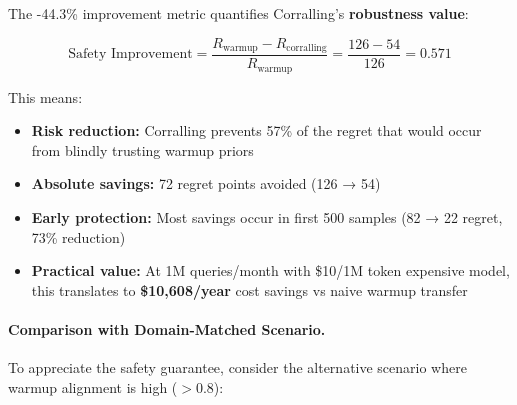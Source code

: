 The -44.3\% improvement metric quantifies Corralling's \textbf{robustness value}:

\begin{equation}
\text{Safety Improvement} = \frac{R_{\text{warmup}} - R_{\text{corralling}}}{R_{\text{warmup}}} = \frac{126 - 54}{126} = 0.571
\end{equation}

This means:
\begin{itemize}[leftmargin=*,nosep]
    \item \textbf{Risk reduction:} Corralling prevents 57\% of the regret that would occur from blindly trusting warmup priors
    \item \textbf{Absolute savings:} 72 regret points avoided (126 → 54)
    \item \textbf{Early protection:} Most savings occur in first 500 samples (82 → 22 regret, 73\% reduction)
    \item \textbf{Practical value:} At 1M queries/month with \$10/1M token expensive model, this translates to \textbf{\$10,608/year} cost savings vs naive warmup transfer
\end{itemize}

\paragraph{Comparison with Domain-Matched Scenario.}
To appreciate the safety guarantee, consider the alternative scenario where warmup alignment is high ($>0.8$):

